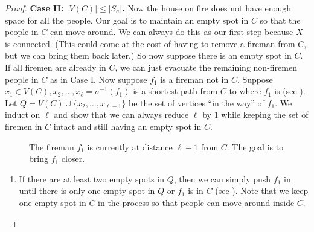 \documentclass{mystyle}
\begin{document}
\begin{proof}
    \textbf{Case II: $|V(C)| \leq |S_a|$.} Now the house on fire does not have enough space for all the people. Our goal is to maintain an empty spot in $C$ so that the people in $C$ can move around. We can always do this as our first step because $X$ is connected. (This could come at the cost of having to remove a fireman from $C$, but we can bring them back later.) So now suppose there is an empty spot in $C$. If all firemen are already in $C$, we can just evacuate the remaining non-firemen people in $C$ as in Case I. Now suppose $f_1$ is a fireman not in $C$. Suppose $x_1 \in V(C), x_2, \ldots, x_\ell= \sigma^{-1}(f_1)$ is a shortest path from $C$ to where $f_1$ is (see ). Let $Q = V(C) \cup \{x_2, \ldots, x_{\ell - 1}\}$ be the set of vertices ``in the way'' of $f_1$. We induct on $\ell$ and show that we can always reduce $\ell$ by $1$ while keeping the set of firemen in $C$ intact and still having an empty spot in $C$. 

    \begin{figure}[ht]
        \centering
        \caption{The fireman $f_1$ is currently at distance $\ell - 1$ from $C$. The goal is to bring $f_1$ closer.}
        \label{fig_3}
    \end{figure}
    
    \begin{enumerate}
        \item If there are at least two empty spots in $Q$, then we can simply push $f_1$ in until there is only one empty spot in $Q$ or $f_1$ is in $C$ (see ). Note that we keep one empty spot in $C$ in the process so that people can move around inside $C$.
        \begin{figure}[ht]
            \centering
\end{figure}
\end{enumerate}
\end{proof}
\end{document}
